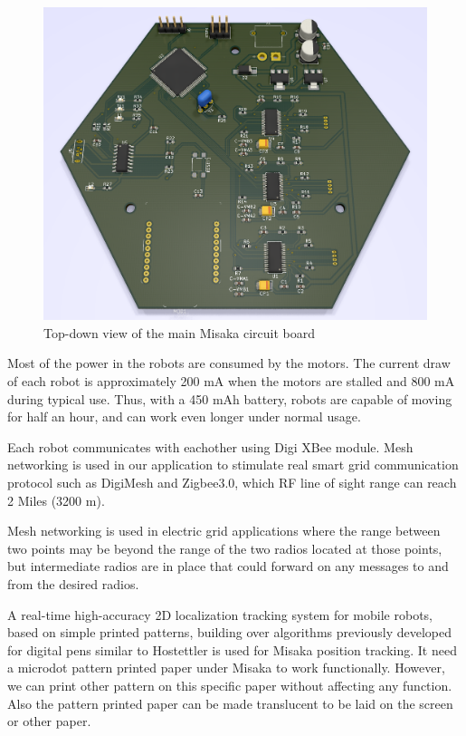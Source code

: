 \documentclass[conference]{IEEEtran}
\begin{document}
\begin{figure}[htbp]
    \centering
    \includegraphics[width=0.6\columnwidth]{PCB.png}
    \caption{Top-down view of the main Misaka circuit board}
    \label{fig:PCB}
\end{figure}

Most of the power in the robots are consumed by the motors. The current draw of each robot is approximately 200 mA when the motors are stalled and 800 mA during typical use. Thus, with a 450 mAh battery, robots are capable of moving for half an hour, and can work even longer under normal usage.

Each robot communicates with eachother using Digi XBee module. Mesh networking is used in our application to stimulate real smart grid communication protocol such as DigiMesh and Zigbee3.0, which RF line of sight range can reach 2 Miles (3200 m).

Mesh networking is used in electric grid applications where the range between two points may be beyond the range of the two radios located at those points, but intermediate radios are in place that could forward on any messages to and from the desired radios.



A real-time high-accuracy 2D localization tracking system for mobile robots, based on simple printed patterns, building over algorithms previously developed for digital pens similar to Hostettler\cite{hostettler2016real} is used
for Misaka position tracking. It need a microdot pattern printed paper under Misaka to work functionally. However, we can print other pattern on this specific paper without affecting any function. Also the pattern printed paper can be made translucent to be laid on the screen or other paper.
\end{document}
